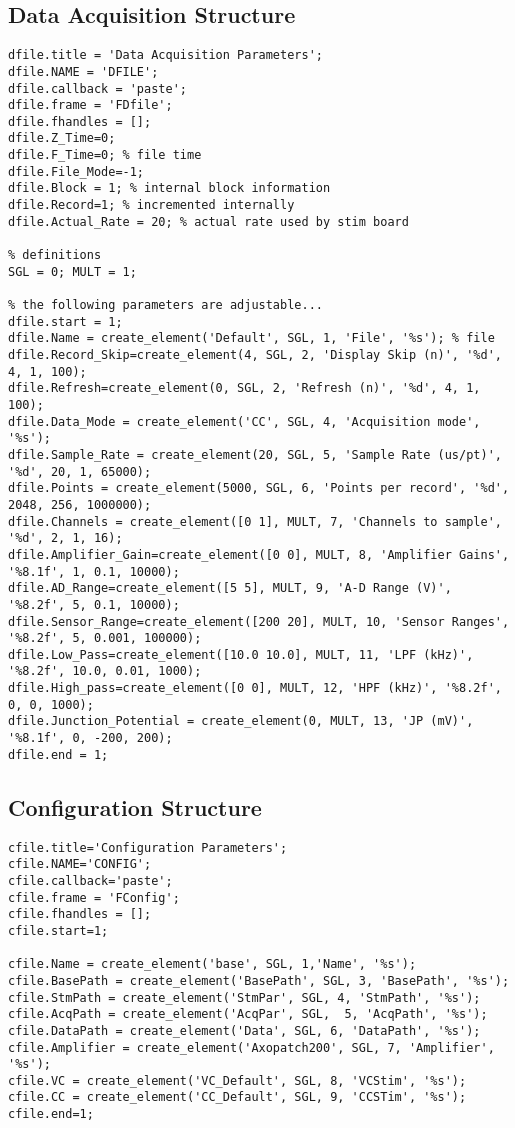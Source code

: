 \documentclass[11pt, letterpaper, titlepage]{paper}
\begin{document}
\subsection{Data Acquisition Structure}

\begin{verbatim}
dfile.title = 'Data Acquisition Parameters';
dfile.NAME = 'DFILE';
dfile.callback = 'paste';
dfile.frame = 'FDfile';
dfile.fhandles = [];
dfile.Z_Time=0;
dfile.F_Time=0; % file time
dfile.File_Mode=-1;
dfile.Block = 1; % internal block information
dfile.Record=1; % incremented internally
dfile.Actual_Rate = 20; % actual rate used by stim board

% definitions
SGL = 0; MULT = 1;

% the following parameters are adjustable...
dfile.start = 1;
dfile.Name = create_element('Default', SGL, 1, 'File', '%s'); % file
dfile.Record_Skip=create_element(4, SGL, 2, 'Display Skip (n)', '%d', 4, 1, 100);
dfile.Refresh=create_element(0, SGL, 2, 'Refresh (n)', '%d', 4, 1, 100);
dfile.Data_Mode = create_element('CC', SGL, 4, 'Acquisition mode', '%s');
dfile.Sample_Rate = create_element(20, SGL, 5, 'Sample Rate (us/pt)', '%d', 20, 1, 65000);
dfile.Points = create_element(5000, SGL, 6, 'Points per record', '%d', 2048, 256, 1000000);
dfile.Channels = create_element([0 1], MULT, 7, 'Channels to sample', '%d', 2, 1, 16);
dfile.Amplifier_Gain=create_element([0 0], MULT, 8, 'Amplifier Gains', '%8.1f', 1, 0.1, 10000);
dfile.AD_Range=create_element([5 5], MULT, 9, 'A-D Range (V)', '%8.2f', 5, 0.1, 10000);
dfile.Sensor_Range=create_element([200 20], MULT, 10, 'Sensor Ranges', '%8.2f', 5, 0.001, 100000);
dfile.Low_Pass=create_element([10.0 10.0], MULT, 11, 'LPF (kHz)', '%8.2f', 10.0, 0.01, 1000);
dfile.High_pass=create_element([0 0], MULT, 12, 'HPF (kHz)', '%8.2f', 0, 0, 1000);
dfile.Junction_Potential = create_element(0, MULT, 13, 'JP (mV)', '%8.1f', 0, -200, 200);
dfile.end = 1;
\end{verbatim}

\subsection{Configuration Structure}

\begin{verbatim}
cfile.title='Configuration Parameters';
cfile.NAME='CONFIG';
cfile.callback='paste';
cfile.frame = 'FConfig';
cfile.fhandles = []; 
cfile.start=1;

cfile.Name = create_element('base', SGL, 1,'Name', '%s');
cfile.BasePath = create_element('BasePath', SGL, 3, 'BasePath', '%s');
cfile.StmPath = create_element('StmPar', SGL, 4, 'StmPath', '%s');
cfile.AcqPath = create_element('AcqPar', SGL,  5, 'AcqPath', '%s');
cfile.DataPath = create_element('Data', SGL, 6, 'DataPath', '%s');
cfile.Amplifier = create_element('Axopatch200', SGL, 7, 'Amplifier', '%s');
cfile.VC = create_element('VC_Default', SGL, 8, 'VCStim', '%s');
cfile.CC = create_element('CC_Default', SGL, 9, 'CCSTim', '%s');
cfile.end=1;
\end{verbatim}
\end{document}
